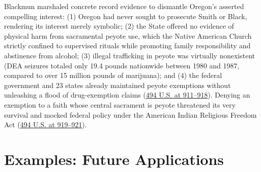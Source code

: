 \documentclass[12pt]{article}
\begin{document}
Blackmun marshaled concrete record evidence to dismantle Oregon's asserted compelling interest: (1) Oregon had never sought to prosecute Smith or Black, rendering its interest merely symbolic; (2) the State offered no evidence of physical harm from sacramental peyote use, which the Native American Church strictly confined to supervised rituals while promoting family responsibility and abstinence from alcohol; (3) illegal trafficking in peyote was virtually nonexistent (DEA seizures totaled only 19.4 pounds nationwide between 1980 and 1987, compared to over 15 million pounds of marijuana); and (4) the federal government and 23 states already maintained peyote exemptions without unleashing a flood of drug-exemption claims (\href{https://supreme.justia.com/cases/federal/us/494/872/}{494 U.S. at 911--918}). Denying an exemption to a faith whose central sacrament is peyote threatened its very survival and mocked federal policy under the American Indian Religious Freedom Act (\href{https://supreme.justia.com/cases/federal/us/494/872/}{494 U.S. at 919--921}).

\section{Examples: Future Applications}
\end{document}
